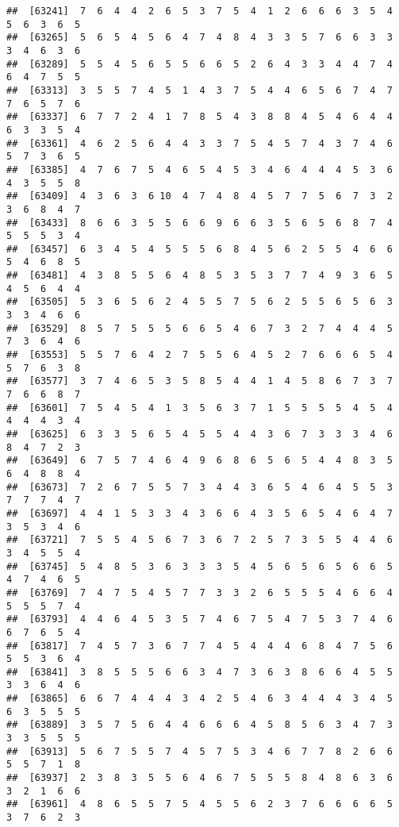 \documentclass[
]{book}
\begin{document}
\begin{verbatim}
##  [63241]  7  6  4  4  2  6  5  3  7  5  4  1  2  6  6  6  3  5  4  5  6  3  6  5
##  [63265]  5  6  5  4  5  6  4  7  4  8  4  3  3  5  7  6  6  3  3  3  4  6  3  6
##  [63289]  5  5  4  5  6  5  5  6  6  5  2  6  4  3  3  4  4  7  4  6  4  7  5  5
##  [63313]  3  5  5  7  4  5  1  4  3  7  5  4  4  6  5  6  7  4  7  7  6  5  7  6
##  [63337]  6  7  7  2  4  1  7  8  5  4  3  8  8  4  5  4  6  4  4  6  3  3  5  4
##  [63361]  4  6  2  5  6  4  4  3  3  7  5  4  5  7  4  3  7  4  6  5  7  3  6  5
##  [63385]  4  7  6  7  5  4  6  5  4  5  3  4  6  4  4  4  5  3  6  4  3  5  5  8
##  [63409]  4  3  6  3  6 10  4  7  4  8  4  5  7  7  5  6  7  3  2  3  6  8  4  7
##  [63433]  8  6  6  3  5  5  6  6  9  6  6  3  5  6  5  6  8  7  4  5  5  5  3  4
##  [63457]  6  3  4  5  4  5  5  5  6  8  4  5  6  2  5  5  4  6  6  5  4  6  8  5
##  [63481]  4  3  8  5  5  6  4  8  5  3  5  3  7  7  4  9  3  6  5  4  5  6  4  4
##  [63505]  5  3  6  5  6  2  4  5  5  7  5  6  2  5  5  6  5  6  3  3  3  4  6  6
##  [63529]  8  5  7  5  5  5  6  6  5  4  6  7  3  2  7  4  4  4  5  7  3  6  4  6
##  [63553]  5  5  7  6  4  2  7  5  5  6  4  5  2  7  6  6  6  5  4  5  7  6  3  8
##  [63577]  3  7  4  6  5  3  5  8  5  4  4  1  4  5  8  6  7  3  7  7  6  6  8  7
##  [63601]  7  5  4  5  4  1  3  5  6  3  7  1  5  5  5  5  4  5  4  4  4  4  3  4
##  [63625]  6  3  3  5  6  5  4  5  5  4  4  3  6  7  3  3  3  4  6  8  4  7  2  3
##  [63649]  6  7  5  7  4  6  4  9  6  8  6  5  6  5  4  4  8  3  5  6  4  8  8  4
##  [63673]  7  2  6  7  5  5  7  3  4  4  3  6  5  4  6  4  5  5  3  7  7  7  4  7
##  [63697]  4  4  1  5  3  3  4  3  6  6  4  3  5  6  5  4  6  4  7  3  5  3  4  6
##  [63721]  7  5  5  4  5  6  7  3  6  7  2  5  7  3  5  5  4  4  6  3  4  5  5  4
##  [63745]  5  4  8  5  3  6  3  3  3  5  4  5  6  5  6  5  6  6  5  4  7  4  6  5
##  [63769]  7  4  7  5  4  5  7  7  3  3  2  6  5  5  5  4  6  6  4  5  5  5  7  4
##  [63793]  4  4  6  4  5  3  5  7  4  6  7  5  4  7  5  3  7  4  6  6  7  6  5  4
##  [63817]  7  4  5  7  3  6  7  7  4  5  4  4  4  6  8  4  7  5  6  5  5  3  6  4
##  [63841]  3  8  5  5  5  6  6  3  4  7  3  6  3  8  6  6  4  5  5  3  3  6  4  6
##  [63865]  6  6  7  4  4  4  3  4  2  5  4  6  3  4  4  4  3  4  5  6  3  5  5  5
##  [63889]  3  5  7  5  6  4  4  6  6  6  4  5  8  5  6  3  4  7  3  3  3  5  5  5
##  [63913]  5  6  7  5  5  7  4  5  7  5  3  4  6  7  7  8  2  6  6  5  5  7  1  8
##  [63937]  2  3  8  3  5  5  6  4  6  7  5  5  5  8  4  8  6  3  6  3  2  1  6  6
##  [63961]  4  8  6  5  5  7  5  4  5  5  6  2  3  7  6  6  6  6  5  3  7  6  2  3

\end{verbatim}
\end{document}
